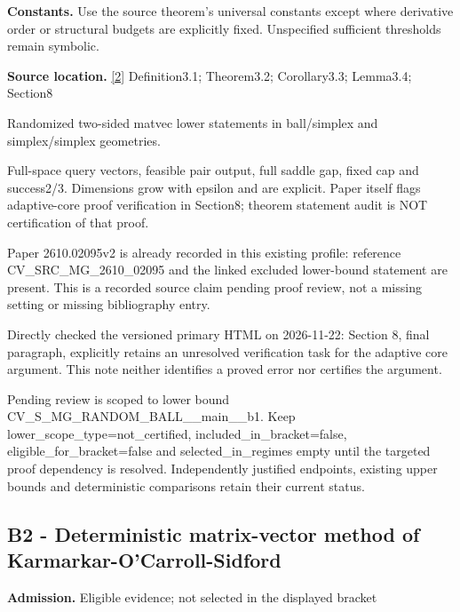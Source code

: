 \documentclass[10pt,a4paper]{article}
\begin{document}
\textbf{Constants.} Use the source theorem’s universal constants except where derivative order or structural budgets are explicitly fixed. Unspecified sufficient thresholds remain symbolic.



\textbf{Source location.} \href{https://arxiv.org/pdf/2610.02095v2}{[2]} Definition3.1; Theorem3.2; Corollary3.3; Lemma3.4; Section8



Randomized two-sided matvec lower statements in ball/simplex and simplex/simplex geometries.



Full-space query vectors, feasible pair output, full saddle gap, fixed cap and success2/3. Dimensions grow with epsilon and are explicit. Paper itself flags adaptive-core proof verification in Section8; theorem statement audit is NOT certification of that proof.



Paper 2610.02095v2 is already recorded in this existing profile: reference CV\_SRC\_MG\_2610\_02095 and the linked excluded lower-bound statement are present. This is a recorded source claim pending proof review, not a missing setting or missing bibliography entry.



Directly checked the versioned primary HTML on 2026-11-22: Section 8, final paragraph, explicitly retains an unresolved verification task for the adaptive core argument. This note neither identifies a proved error nor certifies the argument.



Pending review is scoped to lower bound CV\_S\_MG\_RANDOM\_BALL\_\_main\_\_b1. Keep lower\_scope\_type=not\_certified, included\_in\_bracket=false, eligible\_for\_bracket=false and selected\_in\_regimes empty until the targeted proof dependency is resolved. Independently justified endpoints, existing upper bounds and deterministic comparisons retain their current status.



\subsection{B2 - Deterministic matrix-vector method of Karmarkar-O’Carroll-Sidford}


\textbf{Admission.} Eligible evidence; not selected in the displayed bracket
\end{document}
